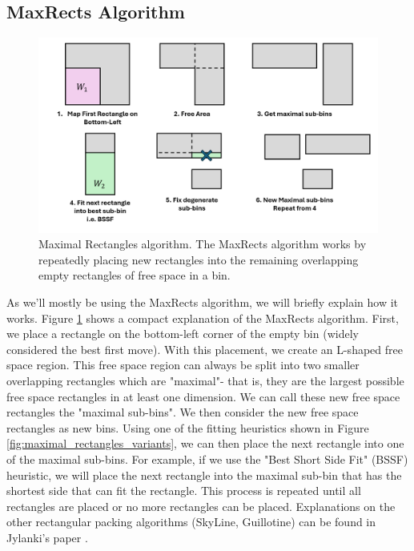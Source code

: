 \subsection{MaxRects Algorithm}

\begin{figure}[htbp]
    \centering
    \includegraphics[width=\textwidth]{images/marp/maxrects.png}
    \caption{Maximal Rectangles algorithm. The MaxRects algorithm works by repeatedly placing new rectangles into the remaining overlapping empty rectangles of free space in a bin.}
    \label{fig:maxrects}
\end{figure}

As we'll mostly be using the MaxRects algorithm, we will briefly explain how it works. Figure \ref{fig:maxrects} shows a compact explanation of the MaxRects algorithm. First, we place a rectangle on the bottom-left corner of the empty bin (widely considered the best first move). With this placement, we create an L-shaped free space region. This free space region can always be split into two smaller overlapping rectangles which are "maximal"- that is, they are the largest possible free space rectangles in at least one dimension. We can call these new free space rectangles the "maximal sub-bins". We then consider the new free space rectangles as new bins. Using one of the fitting heuristics shown in Figure \ref{fig:maximal_rectangles_variants}, we can then place the next rectangle into one of the maximal sub-bins. For example, if we use the "Best Short Side Fit" (BSSF) heuristic, we will place the next rectangle into the maximal sub-bin that has the shortest side that can fit the rectangle. This process is repeated until all rectangles are placed or no more rectangles can be placed. Explanations on the other rectangular packing algorithms (SkyLine, Guillotine) can be found in Jylanki's paper \cite{jylanki2010thousand}. 

